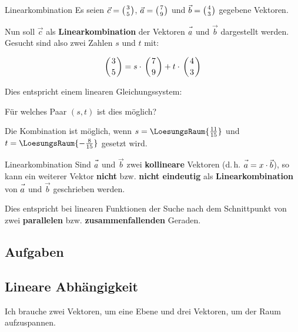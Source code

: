\begin{beispiel}{Linearkombination}{}
  Es seien $\vec{c} = \left(3 \atop 5\right)$, $\vec{a} = \left(7 \atop
  9\right)$ und $\vec{b} = \left(4 \atop 3\right)$ gegebene Vektoren.

  Nun soll $\vec{c}$ als \textbf{Linearkombination} der Vektoren
  $\vec{a\vphantom{b}}$ und $\vec{b}$ dargestellt werden. Gesucht sind also zwei
  Zahlen $s$ und $t$ mit:

  $$\left(3 \atop 5\right) = s\cdot{} \left(7 \atop 9\right) +
  t\cdot{} \left(4 \atop 3\right)$$

  Dies entspricht einem linearen Gleichungssystem:

  Für welches Paar $(s, t)$ ist dies möglich?
  
  
  Die Kombination ist möglich, wenn $s=\LoesungsRaum{\frac{11}{15}}$ und\\
  $t=\LoesungsRaum{-\frac{8}{15}}$ gesetzt wird.
\end{beispiel}

\begin{bemerkung}{Linearkombination}{}
  Sind $\vec{a\vphantom{b}}$ und $\vec{b}$ zwei \textbf{kollineare} Vektoren
  (d.\,h. $\vec{a\vphantom{b}} = x\cdot{}\vec{b}$), so kann ein
  weiterer Vektor \textbf{nicht} bzw. \textbf{nicht eindeutig}  als \textbf{Linearkombination} von $\vec{a\vphantom{b}}$ und
  $\vec{b}$ geschrieben werden.

  Dies entspricht bei linearen Funktionen der Suche nach dem
  Schnittpunkt von zwei \textbf{parallelen} bzw. \textbf{zusammenfallenden} Geraden.
  \end{bemerkung}


\subsection*{Aufgaben}

\newpage
\subsection{Lineare Abhängigkeit}

Ich brauche zwei Vektoren, um eine Ebene und drei Vektoren, um der
Raum aufzuspannen.


